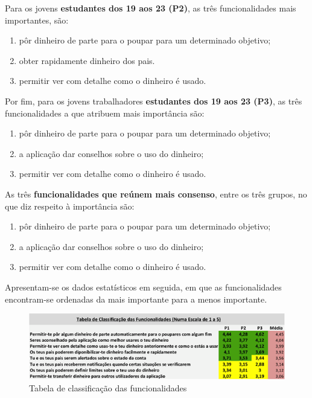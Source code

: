 \documentclass{article}
\begin{document}
      Para os jovens \textbf{estudantes dos 19 aos 23 (P2)}, as três funcionalidades mais importantes, são:

      \begin{enumerate}
        \item pôr dinheiro de parte para o poupar para um determinado objetivo;
        \item obter rapidamente dinheiro dos pais.
        \item permitir ver com detalhe como o dinheiro é usado.
      \end{enumerate}

      Por fim, para os jovens trabalhadores \textbf{estudantes dos 19 aos 23 (P3)}, as três funcionalidades a que atribuem mais importância são:

      \begin{enumerate}
        \item pôr dinheiro de parte para o poupar para um determinado objetivo;
        \item a aplicação dar conselhos sobre o uso do dinheiro;
        \item permitir ver com detalhe como o dinheiro é usado.
      \end{enumerate}

      As três \textbf{funcionalidades que reúnem mais consenso}, entre os três grupos, no que diz respeito à importância são:

      \begin{enumerate}
        \item pôr dinheiro de parte para o poupar para um determinado objetivo;
        \item a aplicação dar conselhos sobre o uso do dinheiro;
        \item permitir ver com detalhe como o dinheiro é usado.
      \end{enumerate}

      Apresentam-se os dados estatísticos em seguida, em que as funcionalidades encontram-se ordenadas da mais importante para a menos importante.


      \begin{figure}[ht!]
        \centering
          \includegraphics[width=0.7\linewidth]{img/img6}
          \caption{Tabela de classificação das funcionalidades}
          \label{img6}
      \end{figure} 
\end{document}
